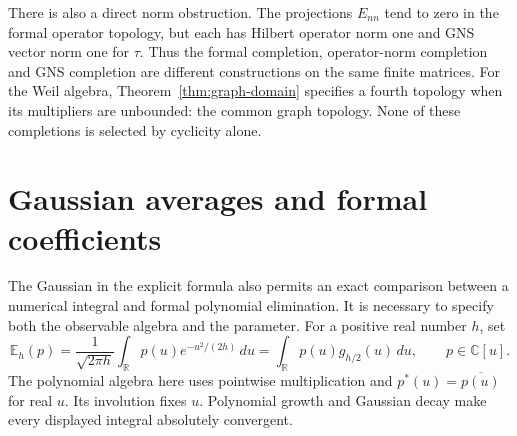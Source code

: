 \documentclass[11pt]{article}
\theoremstyle{definition}
\theoremstyle{remark}
\numberwithin{equation}{section}
\newcommand{\R}{\mathbb R}
\newcommand{\C}{\mathbb C}
\begin{document}
There is also a direct norm obstruction.
The projections $E_{nn}$ tend to zero in the formal operator topology,
but each has Hilbert operator norm one and GNS vector norm one for
$\tau$.  Thus the formal completion, operator-norm completion and
GNS completion are different constructions on the same finite matrices.
For the Weil algebra, Theorem~\ref{thm:graph-domain} specifies a fourth
topology when its multipliers are unbounded: the common graph topology.
None of these completions is selected by cyclicity alone.

\section{Gaussian averages and formal coefficients}
\label{sec:weil-gaussian-coefficients}

The Gaussian in the explicit formula also permits an exact comparison
between a numerical integral and formal polynomial elimination.
It is necessary to specify both the observable algebra and the parameter.
For a positive real number $h$, set
\[
 \mathbb E_h(p)=\frac1{\sqrt{2\pi h}}
       \int_{\R}p(u)e^{-u^2/(2h)}\,du
       =\int_{\R}p(u)g_{h/2}(u)\,du,
 \qquad p\in\C[u].
\]
The polynomial algebra here uses pointwise multiplication and
$p^*(u)=\overline{p(u)}$ for real $u$.
Its involution fixes $u$.  Polynomial growth and Gaussian decay make
every displayed integral absolutely convergent.
\end{document}
